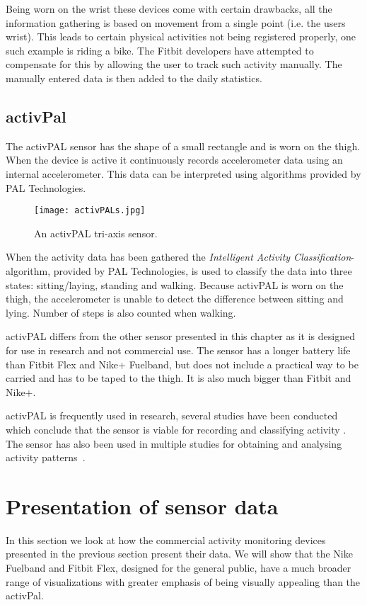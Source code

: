 Being worn on the wrist these devices come with certain drawbacks, all the information gathering is based on movement from a single point (i.e. the users wrist). This leads to certain physical activities not being registered properly, one such example is riding a bike. The Fitbit developers have attempted to compensate for this by allowing the user to track such activity manually. The manually entered data is then added to the daily statistics. 

\subsection{activPal}
\label{sensorActivPal}
The activPAL sensor has the shape of a small rectangle and is worn on the thigh. When the device is active it continuously records accelerometer data using an internal accelerometer. This data can be interpreted using algorithms provided by PAL Technologies.

\begin{figure}[h!]
	\centering
		\texttt{[image: activPALs.jpg]}
		\caption{\footnotesize An activPAL tri-axis sensor.}
		\label{fig:activPal}
\end{figure}

When the activity data has been gathered the \emph{Intelligent Activity Classification}-algorithm, provided by PAL Technologies, is used to classify the data into three states: sitting/laying, standing and walking. Because activPAL is worn on the thigh, the accelerometer is unable to detect the difference between sitting and lying. Number of steps is also counted when walking.

activPAL differs from the other sensor presented in this chapter as it is designed for use in research and not commercial use. The sensor has a longer battery life than Fitbit Flex and Nike+ Fuelband, but does not include a practical way to be carried and has to be taped to the thigh. It is also much bigger than Fitbit and Nike+. 

activPAL is frequently used in research, several studies have been conducted which conclude that the sensor is viable for recording and classifying activity \cite{grant2006, ryan2006, grant2008, tsavourelou}. The sensor has also been used in multiple studies for obtaining and analysing activity patterns~\cite{grant2010, lord, ryan2010}.

\section{Presentation of sensor data}
In this section we look at how the commercial activity monitoring devices presented in the previous section present their data. We will show that the Nike Fuelband and Fitbit Flex, designed for the general public, have a much broader range of visualizations with greater emphasis of being visually appealing than the activPal.


